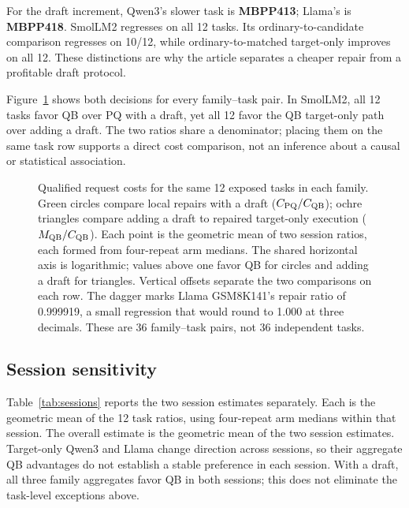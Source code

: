 For the draft increment, Qwen3's slower task is \textbf{MBPP413}; Llama's is \textbf{MBPP418}. SmolLM2 regresses on all 12 tasks. Its ordinary-to-candidate comparison regresses on 10/12, while ordinary-to-matched target-only improves on all 12. These distinctions are why the article separates a cheaper repair from a profitable draft protocol.

Figure~\ref{fig:taskcost} shows both decisions for every family--task pair. In SmolLM2, all 12 tasks favor QB over PQ with a draft, yet all 12 favor the QB target-only path over adding a draft. The two ratios share a denominator; placing them on the same task row supports a direct cost comparison, not an inference about a causal or statistical association.

\begin{figure}[t]
\centering
\caption{Qualified request costs for the same 12 exposed tasks in each family. Green circles compare local repairs with a draft ($C_{\mathrm{PQ}}/C_{\mathrm{QB}}$); ochre triangles compare adding a draft to repaired target-only execution ($M_{\mathrm{QB}}/C_{\mathrm{QB}}$). Each point is the geometric mean of two session ratios, each formed from four-repeat arm medians. The shared horizontal axis is logarithmic; values above one favor QB for circles and adding a draft for triangles. Vertical offsets separate the two comparisons on each row. The dagger marks Llama GSM8K141's repair ratio of 0.999919, a small regression that would round to 1.000 at three decimals. These are 36 family--task pairs, not 36 independent tasks.}
\label{fig:taskcost}
\end{figure}

\subsection{Session sensitivity}
Table~\ref{tab:sessions} reports the two session estimates separately. Each is the geometric mean of the 12 task ratios, using four-repeat arm medians within that session. The overall estimate is the geometric mean of the two session estimates. Target-only Qwen3 and Llama change direction across sessions, so their aggregate QB advantages do not establish a stable preference in each session. With a draft, all three family aggregates favor QB in both sessions; this does not eliminate the task-level exceptions above.

